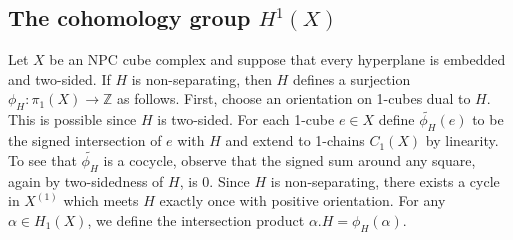 \documentclass[11pt]{amsart}
\numberwithin{thm}{section}
\theoremstyle{remark}
\theoremstyle{definition}
\newcommand{\Z}{\mathbb{Z}}
\begin{document}
\subsection{The cohomology group $H^1(X)$}


Let $X$ be an NPC cube complex and suppose that every hyperplane is embedded and two-sided.  If $H$ is non-separating, then $H$ defines a surjection $\phi_H\colon \pi_1(X)\rightarrow \Z$ as follows.  First, choose an orientation on 1-cubes dual to $H$.  This is possible since $H$ is two-sided.  For each 1-cube $e\in X$ define $\widetilde{\phi_H}(e)$ to be the signed intersection of $e$ with $H$ and extend to 1-chains $C_1(X)$ by linearity. To see that $\widetilde{\phi_H}$ is a cocycle, observe that the signed sum around any square, again by two-sidedness of $H$, is 0. Since $H$ is non-separating, there exists a cycle in $X^{(1)}$ which meets $H$ exactly once with positive orientation. For any $\alpha\in H_1(X)$, we define the intersection product $\alpha.H=\phi_H(\alpha)$. 
\end{document}
